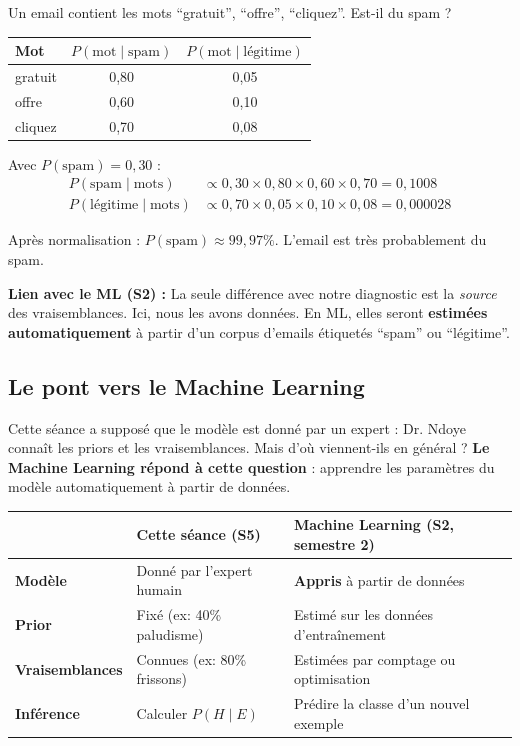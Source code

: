 \documentclass[11pt,a4paper]{article}
\begin{document}
\begin{exemplebox}
Un email contient les mots ``gratuit'', ``offre'', ``cliquez''. Est-il du spam ?

\begin{center}
\begin{tabular}{lcc}
\toprule
\textbf{Mot} & $P(\text{mot} \mid \text{spam})$ & $P(\text{mot} \mid \text{légitime})$ \\
\midrule
gratuit & 0,80 & 0,05 \\
offre & 0,60 & 0,10 \\
cliquez & 0,70 & 0,08 \\
\bottomrule
\end{tabular}
\end{center}

Avec $P(\text{spam}) = 0{,}30$ :
\begin{align*}
P(\text{spam} \mid \text{mots}) &\propto 0{,}30 \times 0{,}80 \times 0{,}60 \times 0{,}70 = 0{,}1008 \\
P(\text{légitime} \mid \text{mots}) &\propto 0{,}70 \times 0{,}05 \times 0{,}10 \times 0{,}08 = 0{,}000028
\end{align*}

Après normalisation : $P(\text{spam}) \approx 99{,}97\%$. L'email est très probablement du spam.

\textbf{Lien avec le ML (S2) :} La seule différence avec notre diagnostic est la \textit{source} des vraisemblances. Ici, nous les avons données. En ML, elles seront \textbf{estimées automatiquement} à partir d'un corpus d'emails étiquetés ``spam'' ou ``légitime''.
\end{exemplebox}

\subsection{Le pont vers le Machine Learning}

Cette séance a supposé que le modèle est donné par un expert : Dr. Ndoye connaît les priors et les vraisemblances. Mais d'où viennent-ils en général ? \textbf{Le Machine Learning répond à cette question} : apprendre les paramètres du modèle automatiquement à partir de données.

\begin{center}
\begin{tabular}{lp{5cm}p{5cm}}
\toprule
& \textbf{Cette séance (S5)} & \textbf{Machine Learning (S2, semestre 2)} \\
\midrule
\textbf{Modèle} & Donné par l'expert humain & \textbf{Appris} à partir de données \\
\textbf{Prior} & Fixé (ex: 40\% paludisme) & Estimé sur les données d'entraînement \\
\textbf{Vraisemblances} & Connues (ex: 80\% frissons) & Estimées par comptage ou optimisation \\
\textbf{Inférence} & Calculer $P(H \mid E)$ & Prédire la classe d'un nouvel exemple \\
\bottomrule
\end{tabular}
\end{center}
\end{document}
